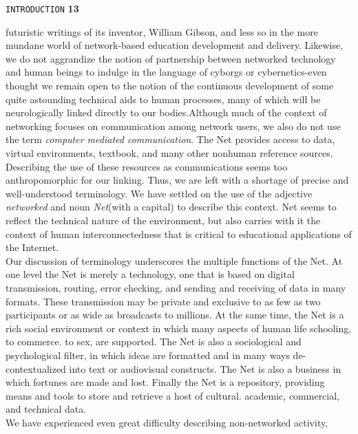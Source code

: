 \documentclass{book}
\begin{document}
\begin{flushright}
\texttt{INTRODUCTION}
\hspace*{0.5cm}
\textbf{13}
\end{flushright}
\vspace*{0.7cm}
futuristic writings of its inventor, William Gibson, and less so in the more mundane
world of network-based education development and delivery. Likewise, we do not
aggrandize the notion of partnership between networked technology
and human beings to indulge in the language of cyborgs or cybernetics-even thought we remain
open to the notion of the continuous development of some quite astounding
technical aids to human processes, many of which will be neurologically linked directly to
our bodies.Although much of the context of networking focuses on communication
among network users, we also do not use the term \emph{computer mediated communication}.
The Net provides access to data, virtual environments, textbook, and many other
nonhuman reference sources. Describing the use of these resources as communications
seems too anthropomorphic for our linking. Thus, we are left with a shortage of precise
and well-understood terminology. We have settled on the use of the adjective \emph{networked}
and noun \emph{Net}(with a capital) to describe this context. Net seems to reflect
the technical nature of the environment, but also carries with it the context of human
interconnectedness that is critical to educational applications of the Internet.
\\\hspace*{0.5cm} Our discussion of terminology underscores the multiple functions of the Net.
At one level the Net is merely a technology, one that is based on digital transmission,
routing, error checking, and sending and receiving of data in many formats.
These transmission may be private and exclusive to as few as two participants or as wide as
broadcasts to millions. At the same time, the Net is a rich social environment or
context in which many aspects of human life schooling, to commerce. to sex, are supported.
The Net is also a sociological and psychological filter, in which ideas are
formatted and in many ways de-contextualized into text or audiovisual constructs.
The Net is also a business in which fortunes are made and lost. Finally the Net is a
repository, providing means and tools to store and retrieve a host of cultural. academic,
commercial, and technical data.
\\\hspace*{0.5cm}We have experienced even great difficulty describing non-networked activity,
\end{document}
